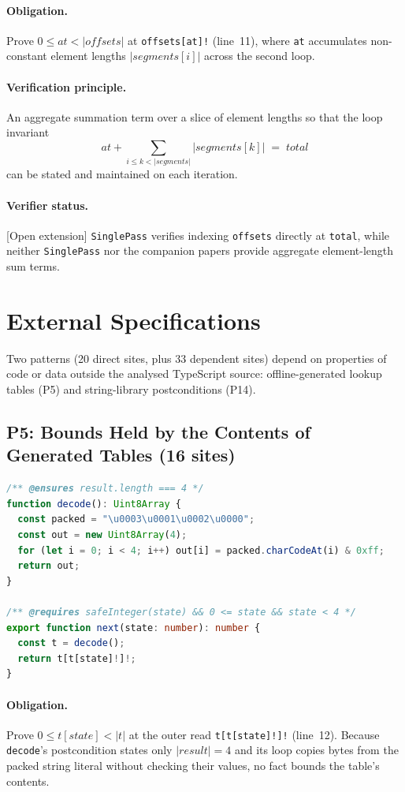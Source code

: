 \documentclass[10pt,a4paper]{article}
\newcommand{\len}[1]{|#1|}
\newcommand{\code}[1]{\textcolor{codec}{\texttt{#1}}}
\newcommand{\lean}[1]{\texttt{\small #1}}
\newcommand{\statusc}[1]{\textcolor{conjc}{\textsf{\small[#1]}}}
\newcommand{\entry}[1]{\paragraph{#1.}}
\renewcommand{\lean}[1]{\textcolor{leanc}{\texttt{\small #1}}}%
\begin{document}
\entry{Obligation}
Prove $0\le\mathit{at}<\len{\mathit{offsets}}$ at \code{offsets[at]!}
(line~11), where \code{at} accumulates non-constant element lengths
$\len{\mathit{segments}[i]}$ across the second loop.

\entry{Verification principle}
An aggregate summation term over a slice of element lengths so that the
loop invariant
\[
  \mathit{at} + \sum_{i\le k<\len{\mathit{segments}}} \len{\mathit{segments}[k]}
  \;=\; \mathit{total}
\]
can be stated and maintained on each iteration.

\entry{Verifier status}
\statusc{Open extension} \lean{SinglePass} verifies indexing
\code{offsets} directly at \code{total}, while neither \lean{SinglePass}
nor the companion papers provide aggregate element-length sum terms.

\section{External Specifications}\label{sec:external}

Two patterns (20 direct sites, plus 33 dependent sites) depend on
properties of code or data outside the analysed TypeScript source:
offline-generated lookup tables (P5) and string-library postconditions
(P14).

\subsection{P5: Bounds Held by the Contents of Generated Tables (16 sites)}\label{sec:p5}

\begin{lstlisting}[language=TypeScript]
/** @ensures result.length === 4 */
function decode(): Uint8Array {
  const packed = "\u0003\u0001\u0002\u0000";
  const out = new Uint8Array(4);
  for (let i = 0; i < 4; i++) out[i] = packed.charCodeAt(i) & 0xff;
  return out;
}

/** @requires safeInteger(state) && 0 <= state && state < 4 */
export function next(state: number): number {
  const t = decode();
  return t[t[state]!]!;
}
\end{lstlisting}

\entry{Obligation}
Prove $0\le t[\mathit{state}]<\len{t}$ at the outer read
\code{t[t[state]!]!} (line~12). Because \code{decode}'s postcondition
states only $\len{\mathit{result}}=4$ and its loop copies bytes from the
packed string literal without checking their values, no fact bounds the
table's contents.
\end{document}
